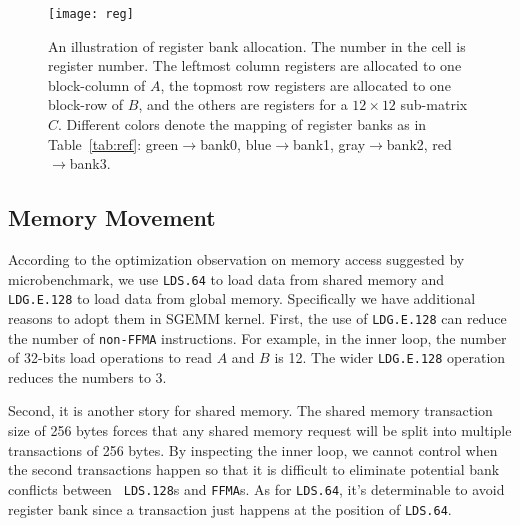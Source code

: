 \begin{figure}[htbp]
\begin{center}
\texttt{[image: reg]}
\caption{An illustration of register bank allocation. The number in the cell is register number.
    The leftmost column registers are allocated to one block-column of $A$, the
topmost row registers are allocated to one block-row of $B$, and the others are registers for
a $12 \times 12$ sub-matrix $C$. Different colors denote the mapping of register banks as in Table~\ref{tab:ref}: green$\rightarrow$bank0, 
blue$\rightarrow$bank1, gray$\rightarrow$bank2, red$\rightarrow$bank3.}
\label{fig:reg}
\end{center}
\end{figure}


\subsection{Memory Movement}
According to the optimization observation on memory access suggested by microbenchmark, we use {\tt LDS.64} to load 
data from shared memory and {\tt LDG.E.128} to load data from global memory. Specifically we have additional reasons to 
adopt them in SGEMM kernel. First, the use of {\tt LDG.E.128} can reduce the number of {\tt non-FFMA} instructions. For 
example,  in the inner loop, the number of 32-bits load operations to read $A$ and $B$ is 12. The wider {\tt LDG.E.128} 
operation reduces the numbers to 3.

Second, it is another story for shared memory. The shared memory transaction size of 256 bytes forces that any shared 
memory request will be split into multiple transactions of 256 bytes. By inspecting the inner loop, we cannot control 
when the second transactions happen so that it is difficult to eliminate potential bank conflicts between {\tt 
LDS.128}s and {\tt FFMA}s. As for {\tt LDS.64}, it's determinable to avoid register bank since a transaction just 
happens at the position of {\tt LDS.64}.

